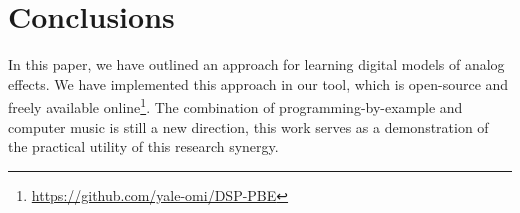\section{Conclusions}

In this paper, we have outlined an approach for learning digital models of analog effects.
We have implemented this approach in our tool, which is open-source and freely available online\footnote{\url{https://github.com/yale-omi/DSP-PBE}}.
The combination of programming-by-example and computer music is still a new direction, this work serves as a demonstration of the practical utility of this research synergy.